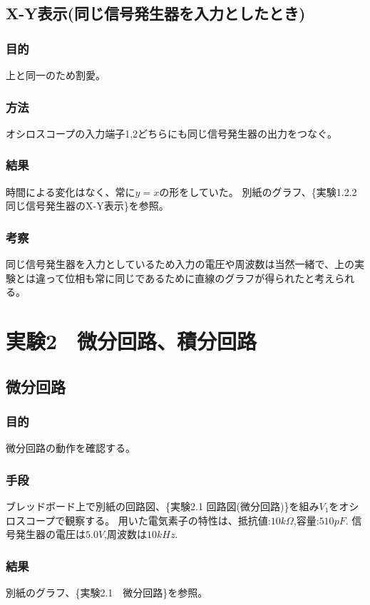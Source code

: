 \documentclass{jsarticle}
\begin{document}
\subsection{X-Y表示(同じ信号発生器を入力としたとき)}
\subsubsection{目的}
上と同一のため割愛。
\subsubsection{方法}
オシロスコープの入力端子1,2どちらにも同じ信号発生器の出力をつなぐ。
\subsubsection{結果}
時間による変化はなく、常に$y = x$の形をしていた。
別紙のグラフ、\{実験1.2.2　同じ信号発生器のX-Y表示\}を参照。
\subsubsection{考察}
同じ信号発生器を入力としているため入力の電圧や周波数は当然一緒で、上の実験とは違って位相も常に同じであるために直線のグラフが得られたと考えられる。

\section{実験2　微分回路、積分回路}
\subsection{微分回路}
\subsubsection{目的}
微分回路の動作を確認する。
\subsubsection{手段}
ブレッドボード上で別紙の回路図、\{実験2.1 回路図(微分回路)\}を組み$V_1$をオシロスコープで観察する。
用いた電気素子の特性は、抵抗値:$10k\Omega$,容量:$510pF$.
信号発生器の電圧は$5.0V$,周波数は$10kHz$.
\subsubsection{結果}
別紙のグラフ、\{実験2.1　微分回路\}を参照。
\end{document}
